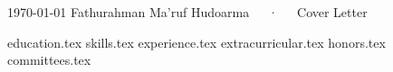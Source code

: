 \documentclass[11pt, a4paper]{awesome-cv}
\newif\ifResume
\newif\ifCoverLetter
\newcommand*{\sectiondir}{section/}
\newcommand{\texttype}{Curriculum Vitae}
\renewcommand{\texttype}{Resume}
\renewcommand{\texttype}{Cover Letter}
\newcommand{\fullname}{Fathurahman Ma'ruf Hudoarma}
\begin{document}
\makecvheader

\makecvfooter
    {\today}
    {\fullname~~~·~~~\texttype}
    {\ifCoverLetter \else \thepage \fi}

\ifCoverLetter
    \makelettertitle
\fi

\ifCoverLetter
    {coverletter.tex}
    \makeletterclosing
\else
    \ifResume
        {summary.tex}
        {experience.tex}
        {education.tex}
        {extracurricular.tex}
        {honors.tex}
        {committees.tex}
    \else
        {education.tex}
        {skills.tex}
        {experience.tex}
        {extracurricular.tex}
        {honors.tex}
        {committees.tex}
    \fi
\fi
\end{document}
